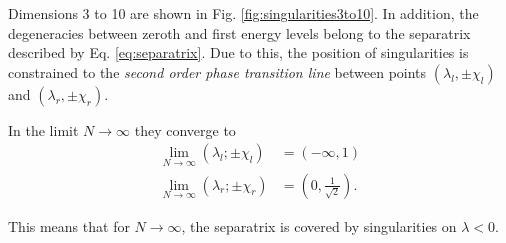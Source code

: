 Dimensions 3 to 10 are shown in Fig. \ref{fig:singularities3to10}.
In addition, the degeneracies between zeroth and first energy levels belong to the separatrix described by Eq. \ref{eq:separatrix}. Due to this, the position of singularities is constrained to the \emph{second order phase transition line} between points $(\lambda_l,\pm\chi_l)$ and $(\lambda_r,\pm\chi_r)$.



In the limit $N\rightarrow\infty$ they converge to
\begin{align*}
    \lim_{N\rightarrow \infty}(\lambda_l ;\pm\chi_l)&= \left(-\infty,1\right)\\
    \lim_{N\rightarrow \infty}(\lambda_r ;\pm\chi_r)&= \left(0,\frac{1}{\sqrt{2}}\right).
\end{align*}

This means that for $N\rightarrow \infty$, the separatrix is covered by singularities on $\lambda<0$.

